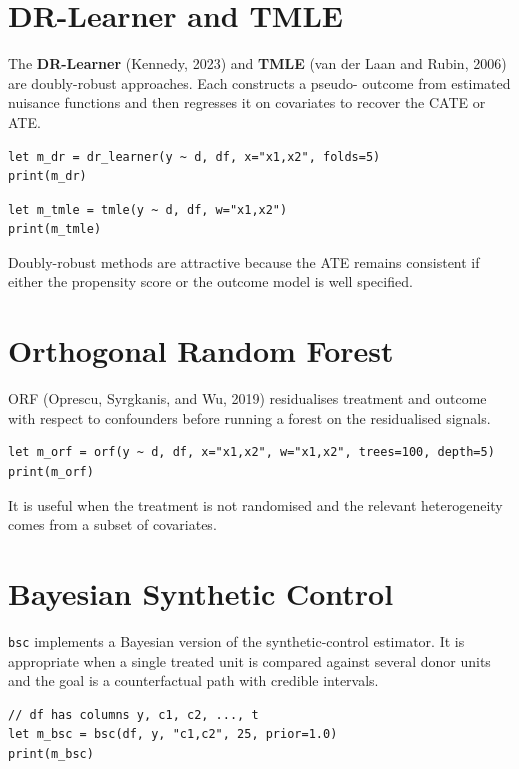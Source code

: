 \section{DR-Learner and TMLE}

The \textbf{DR-Learner} (Kennedy, 2023) and \textbf{TMLE} (van der Laan
and Rubin, 2006) are doubly-robust approaches. Each constructs a pseudo-
outcome from estimated nuisance functions and then regresses it on
covariates to recover the CATE or ATE.

\begin{lstlisting}[caption={DR-Learner}]
let m_dr = dr_learner(y ~ d, df, x="x1,x2", folds=5)
print(m_dr)
\end{lstlisting}

\begin{lstlisting}[caption={TMLE}]
let m_tmle = tmle(y ~ d, df, w="x1,x2")
print(m_tmle)
\end{lstlisting}

Doubly-robust methods are attractive because the ATE remains consistent
if either the propensity score or the outcome model is well specified.

\section{Orthogonal Random Forest}

ORF (Oprescu, Syrgkanis, and Wu, 2019) residualises treatment and
outcome with respect to confounders before running a forest on the
residualised signals.

\begin{lstlisting}[caption={Orthogonal Random Forest}]
let m_orf = orf(y ~ d, df, x="x1,x2", w="x1,x2", trees=100, depth=5)
print(m_orf)
\end{lstlisting}

It is useful when the treatment is not randomised and the relevant
heterogeneity comes from a subset of covariates.

\section{Bayesian Synthetic Control}

\texttt{bsc} implements a Bayesian version of the synthetic-control estimator.
It is appropriate when a single treated unit is compared against several
donor units and the goal is a counterfactual path with credible
intervals.

\begin{lstlisting}[caption={Bayesian synthetic control}]
// df has columns y, c1, c2, ..., t
let m_bsc = bsc(df, y, "c1,c2", 25, prior=1.0)
print(m_bsc)
\end{lstlisting}

